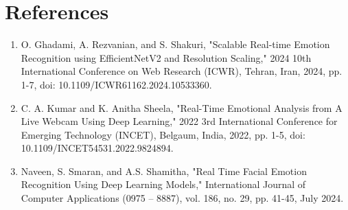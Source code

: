 \documentclass{article}
\begin{document}
\section*{References}
\begin{enumerate}
    \item O. Ghadami, A. Rezvanian, and S. Shakuri, "Scalable Real-time Emotion Recognition using EfficientNetV2 and Resolution Scaling," 2024 10th International Conference on Web Research (ICWR), Tehran, Iran, 2024, pp. 1-7, doi: 10.1109/ICWR61162.2024.10533360.
    \item C. A. Kumar and K. Anitha Sheela, "Real-Time Emotional Analysis from A Live Webcam Using Deep Learning," 2022 3rd International Conference for Emerging Technology (INCET), Belgaum, India, 2022, pp. 1-5, doi: 10.1109/INCET54531.2022.9824894.
    \item Naveen, S. Smaran, and A.S. Shamitha, "Real Time Facial Emotion Recognition Using Deep Learning Models," International Journal of Computer Applications (0975 – 8887), vol. 186, no. 29, pp. 41-45, July 2024.
\end{enumerate}
\end{document}
